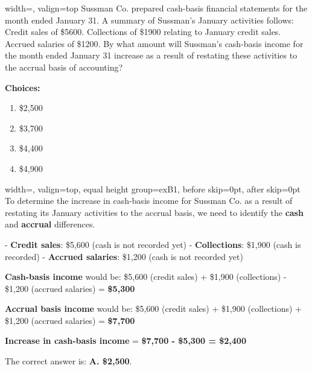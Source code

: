 \begin{bluebox}[Question]{width=\linewidth, valign=top}
Sussman Co. prepared cash-basis financial statements for the month ended January 31. A summary of Sussman's January activities follows: Credit sales of \$5600. Collections of \$1900 relating to January credit sales. Accrued salaries of \$1200. By what amount will Sussman's cash-basis income for the month ended January 31 increase as a result of restating these activities to the accrual basis of accounting?

\medskip
\noindent\textbf{Choices:}
\begin{enumerate}[label=\Alph*)]
  \item \$2,500
  \item \$3,700
  \item \$4,400
  \item \$4,900
\end{enumerate}
\end{bluebox}
\noindent
\begin{minipage}[t]{0.49\linewidth}
\begin{bluebox}{width=\linewidth, valign=top, equal height group=exB1, before skip=0pt, after skip=0pt}
To determine the increase in cash-basis income for Sussman Co. as a result of restating its January activities to the accrual basis, we need to identify the \textbf{cash} and \textbf{accrual} differences.

- \textbf{Credit sales}: \$5,600 (cash is not recorded yet)
- \textbf{Collections}: \$1,900 (cash is recorded)
- \textbf{Accrued salaries}: \$1,200 (cash is not recorded yet)

\textbf{Cash-basis income} would be:
\$5,600 (credit sales) + \$1,900 (collections) - \$1,200 (accrued salaries) = \textbf{\$5,300}

\textbf{Accrual basis income} would be:
\$5,600 (credit sales) + \$1,900 (collections) + \$1,200 (accrued salaries) = \textbf{\$7,700}

\textbf{Increase in cash-basis income} = \textbf{\$7,700 - \$5,300 = \$2,400}

The correct answer is: \textbf{A. \$2,500}.
\end{bluebox}
\end{minipage}
\hfill
